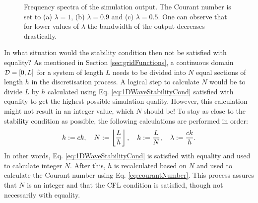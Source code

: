 \begin{figure}[t]
    \caption{Frequency spectra of the simulation output. The Courant number is set to (a) $\lambda = 1$, (b) $\lambda = 0.9$ and (c) $\lambda = 0.5$. One can observe that for lower values of $
    \lambda$ the bandwidth of the output decreases drastically. \label{fig:1DWaveBandwidth}}
\end{figure}

In what situation would the stability condition then not be satisfied with equality? As mentioned in Section \ref{sec:gridFunctions}, a continuous domain $\mathcal{D} = [0,L]$ for a system of length $L$ needs to be divided into $N$ equal sections of length $h$ in the discretisation process. A logical step to calculate $N$ would be to divide $L$ by $h$ calculated using Eq. \eqref{eq:1DWaveStabilityCond} satisfied with equality to get the highest possible simulation quality. However, this calculation might not result in an integer value, which $N$ should be! To stay as close to the stability condition as possible, the following calculations are performed in order:
\begin{equation}\label{eq:orderOfCalc}
    h := ck, \quad N := \floor[\frac{L}{h}], \quad h := \frac{L}{N}, \quad \lambda := \frac{ck}{h}.
\end{equation}
In other words, Eq. \eqref{eq:1DWaveStabilityCond} is satisfied with equality and used to calculate integer $N$. After this, $h$ is recalculated based on $N$ and used to calculate the Courant number using Eq. \eqref{eq:courantNumber}. This process assures that $N$ is an integer and that the CFL condition is satisfied, though not necessarily with equality.


